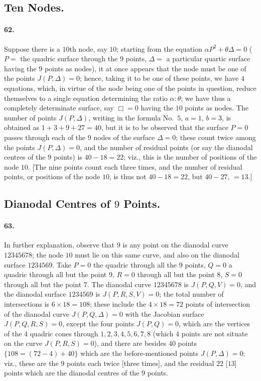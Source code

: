 \documentclass[11pt,a4paper]{article}
\begin{document}
\bigskip

\subsection*{Ten Nodes.}

\paragraph{62.}
Suppose there is a $10$th node, say $10$; starting from the equation
$\alpha P^2 + \theta \Delta = 0$ ($P = $ the quadric surface through the $9$ points,
$\Delta = $ a particular quartic surface having the $9$ points as nodes), it at once
appears that the node must be one of the points $J(P, \Delta) = 0$; hence, taking it
to be one of these points, we have $4$ equations, which, in virtue of the node being
one of the points in question, reduce themselves to a single equation determining the
ratio $\alpha : \theta$; we have thus a completely determinate surface, say $\Box = 0$
having the $10$ points as nodes. The number of points $J(P, \Delta)$, writing in the
formula No.\ $5$, $a = 1$, $b = 3$, is obtained as $1 + 3 + 9 + 27 = 40$, but it is
to be observed that the surface $P = 0$ passes through each of the $9$ nodes of the
surface $\Delta = 0$; these count twice among the points $J(P, \Delta) = 0$, and
the number of residual points (or say the dianodal centres of the $9$ points) is
$40 - 18 = 22$; viz., this is the number of positions of the node $10$. [The nine
points count each three times, and the number of residual points, or positions of
the node $10$, is thus not $40 - 18 = 22$, but $40 - 27$, $= 13$.]

\bigskip

\subsection*{Dianodal Centres of $9$ Points.}

\paragraph{63.}
In further explanation, observe that $9$ is any point on the dianodal curve
$12345678$; the node $10$ must lie on this same curve, and also on the dianodal
surface $1234569$. Take $P = 0$ the quadric through all the $9$ points, $Q = 0$ a
quadric through all but the point $9$, $R = 0$ through all but the point $8$,
$S = 0$ through all but the point $7$. The dianodal curve $12345678$ is
$J(P, Q, V) = 0$, and the dianodal surface $1234569$ is $J(P, R, S, V) = 0$; the
total number of intersections is $6 \times 18 = 108$; these include the
$4 \times 18 = 72$ points of intersection of the dianodal curve $J(P, Q, \Delta) = 0$
with the Jacobian surface $J(P, Q, R, S) = 0$, except the four points $J(P, Q) = 0$,
which are the vertices of the $4$ quadric cones through $1, 2, 3, 4, 5, 6, 7, 8$
(which $4$ points are not situate on the curve $J(P, R, S) = 0$), and there are
besides $40$ points $\{108 = (72 - 4) + 40\}$ which are the before-mentioned points
$J(P, \Delta) = 0$; viz., these are the $9$ points each twice [three times], and the
residual $22$ [$13$] points which are the dianodal centres of the $9$ points.
\end{document}

